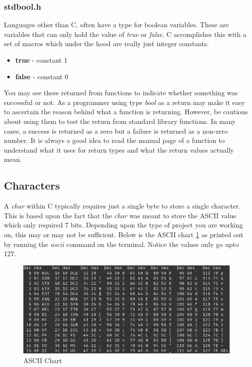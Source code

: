 \documentclass[../main.tex]{subfiles}
\begin{document}
	\subsubsection{stdbool.h}
	Languages other than C, often have a type for boolean variables.  These are variables that can only hold the value of \textit{true} or \textit{false}.  C accomplishes this with a set of macros which under the hood are really just integer constants.
	
	\begin{itemize}
		\item \textbf{true} - constant 1
		\item \textbf{false} - constant 0
	\end{itemize}

	You may see these returned from functions to indicate whether something was successful or not.  As a programmer using type \textit{bool} as a return may make it easy to ascertain the reason behind what a function is returning.  However, be cautious about using them to test the return from standard library functions.  In many cases, a success is returned as a zero but a failure is returned as a non-zero number.  It is always a good idea to read the manual page of a function to understand what it uses for return types and what the return values actually mean. 
	

	\subsection{Characters}
	
	A \textit{char} within C typically requires just a single byte to store a single character.  This is based upon the fact that the \textit{char} was meant to store the ASCII value which only required 7 bits.  Depending upon the type of project you are working on, this may or may not be sufficient. Below is the ASCII chart \ref{fig:ascii} as printed out by running the \textit{ascii} command on the terminal.  Notice the values only go upto 127.
	
	\begin{figure}[h]
		\centering\includegraphics[scale=0.5]{ascii.png}
		\caption{ASCII Chart}
		\label{fig:ascii} %
	\end{figure}
	
\end{document}
